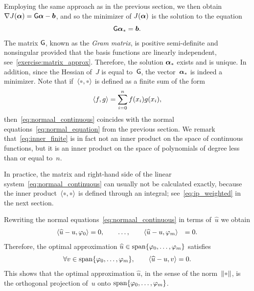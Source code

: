 Employing the same approach as in the previous section,
we then obtain $\nabla J(\mathbf{\boldsymbol{\alpha}}) = \mathsf G \mathbf{\boldsymbol{\alpha}} - \mathbf{\boldsymbol{b}}$,
and so the minimizer of $J(\mathbf{\boldsymbol{\alpha}})$ is the solution to the equation
\begin{equation}
    \label{eq:normaal_continuous}
    \mathsf G \mathbf{\boldsymbol{\alpha}}_* = \mathbf{\boldsymbol{b}}.
\end{equation}
The matrix $\mathsf G$,
known as the \emph{Gram matrix},
is positive semi-definite and nonsingular provided that the basis functions are linearly independent,
see~\cref{exercise:matrix_approx}.
Therefore, the solution $\mathbf{\boldsymbol{\alpha}}_*$ exists and is unique.
In addition, since the Hessian of~$J$ is equal to~$\mathsf G$,
the vector~$\mathbf{\boldsymbol{\alpha}}_*$ is indeed a minimizer.
Note that if~$\ip{\placeholder,\placeholder}$ is defined as a finite sum of the form
\begin{equation}
    \label{eq:inner_finite}
    \langle f, g\rangle = \sum_{i=0}^{n} f(x_i) g(x_i),
\end{equation}
then~\eqref{eq:normaal_continuous} coincides with the normal equations~\eqref{eq:normal_equation} from the previous section.
We remark that~\eqref{eq:inner_finite} is in fact not an inner product on the space of continuous functions,
but it is an inner product on the space of polynomials of degree less than or equal to~$n$.

In practice, the matrix and right-hand side of the linear system~\eqref{eq:normaal_continuous} can usually not be calculated exactly,
because the inner product~$\ip{\placeholder,\placeholder}$ is defined through an integral; see~\eqref{eq:ip_weighted} in the next section.

\begin{remark}
    Rewriting the normal equations~\eqref{eq:normaal_continuous} in terms of~$\widehat u$
    we obtain
    \begin{align*}
        \langle\widehat u - u,\varphi_0\rangle &= 0,
        \qquad
        \dots, \qquad
        \langle\widehat u - u,\varphi_m\rangle &= 0.
    \end{align*}
    Therefore, the optimal approximation $\widehat u \in \operatorname{span} \{ \varphi_0, \dotsc, \varphi_m \}$ satisfies
    \[
        \forall v \in \operatorname{span} \{ \varphi_0, \dotsc, \varphi_m \}, \qquad \langle\widehat u - u, v\rangle = 0.
    \]
    This shows that the optimal approximation $\widehat u$,
    in the sense of the norm~$\norm{\placeholder}$,
    is the orthogonal projection of~$u$ onto $\operatorname{span} \{ \varphi_0, \dotsc, \varphi_m \}$.
\end{remark}
